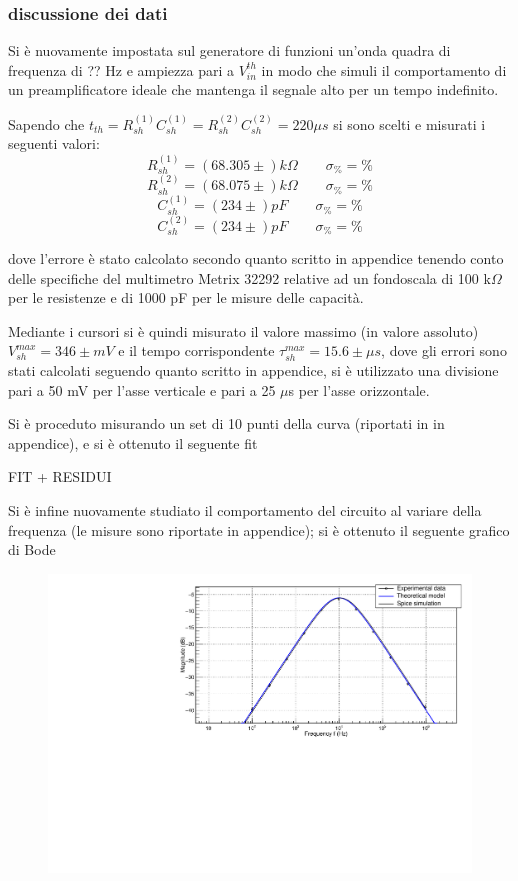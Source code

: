 \documentclass{article}
\begin{document}
\subsubsection{discussione dei dati}
Si è nuovamente impostata sul generatore di funzioni un'onda quadra di frequenza di ?? Hz e ampiezza pari a $V_{in}^{th}$
in modo che simuli il comportamento di un preamplificatore ideale che mantenga il segnale alto per un tempo indefinito.

Sapendo che $t_{th}=R_{sh}^{(1)} C_{sh}^{(1)} = R_{sh}^{(2)} C_{sh}^{(2)}=220 \mu s$ si sono scelti e misurati i seguenti valori:
$$
R_{sh}^{(1)} = (68.305  \pm )k\Omega \quad\quad \sigma_{\%}=  \%
$$
$$
R_{sh}^{(2)} = (68.075  \pm )k\Omega \quad\quad \sigma_{\%}=  \%
$$
$$
C_{sh}^{(1)}= (234 \pm  )pF \quad\quad \sigma_{\%}=  \%
$$
$$
C_{sh}^{(2)}= (234 \pm  )pF \quad\quad \sigma_{\%}=  \%
$$

dove l'errore è stato calcolato secondo quanto scritto in appendice tenendo conto delle specifiche del multimetro Metrix 32292 relative ad un fondoscala di 
100 k$\Omega$ per le resistenze e di 1000 pF per le misure delle capacità.

Mediante i cursori si è quindi misurato il valore massimo (in valore assoluto) $V_{sh}^{max}=346 \pm mV$ e il tempo corrispondente $\tau_{sh}^{max}=15.6 \pm \mu s$, dove gli errori 
sono stati calcolati seguendo quanto scritto in appendice, si è utilizzato una divisione pari a 50 mV per l'asse verticale e pari a 25 $\mu$s per l'asse 
orizzontale.

Si è proceduto misurando un set di 10 punti della curva (riportati in in appendice), e si è ottenuto il seguente fit 
 
FIT + RESIDUI

Si è infine nuovamente studiato il comportamento del circuito al variare della frequenza (le misure sono riportate in appendice); si è ottenuto il seguente grafico di Bode

\begin{center}
    \begin{figure}[H]
    \centering
    \includegraphics[scale=0.375, angle=0]{bodeshaper_no_pz.pdf}
    \caption{}
    \label{fig:bodeshaper_no_pz}
    \end{figure}
\end{center}
\end{document}
